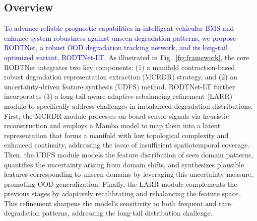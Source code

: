\documentclass[lettersize,journal]{IEEEtran}
\newcommand{\rev}[1]{\textcolor{blue}{#1}}
\begin{document}
\subsection{Overview}

\rev{To advance reliable prognostic capabilities in intelligent vehicular BMS and enhance system robustness against unseen degradation patterns, we propose RODTNet, a robust OOD degradation tracking network, and its long-tail optimized variant, RODTNet-LT.} As illustrated in Fig.~\ref{fig:framework}, the core RODTNet integrates two key components: (1) a manifold contraction-based robust degradation representation extraction (MCRDR) strategy, and (2) an uncertainty-driven feature synthesis (UDFS) method. RODTNet-LT further incorporates (3) a long-tail-aware adaptive rebalancing refinement (LARR) module to specifically address challenges in imbalanced degradation distributions.
% 
First, the MCRDR module processes on-board sensor signals via heuristic reconstruction and employs a Mamba model to map them into a latent representation that forms a manifold with low topological complexity and enhanced continuity, addressing the issue of insufficient spatiotemporal coverage.
%
Then, the UDFS module models the feature distribution of seen domain patterns, quantifies the uncertainty arising from domain shifts, and synthesizes plausible features corresponding to unseen domains by leveraging this uncertainty measure, promoting OOD generalization. 
% 
Finally, the LARR module complements the previous stages by adaptively recalibrating and rebalancing the feature space. This refinement sharpens the model's sensitivity to both frequent and rare degradation patterns, addressing the long-tail distribution challenge.
\end{document}
